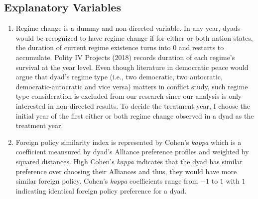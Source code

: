 \documentclass[12pt,a4paper]{article}
\begin{document}
\subsection{Explanatory Variables}
\begin{enumerate}
    \item Regime change is a dummy and non-directed variable. In any year, dyads would be recognized to have regime change if for either or both nation states, the duration of current regime existence turns into 0 and restarts to accumulate. Polity IV Projects (2018) records duration of each regime's survival at the year level. \parencite{marshall_2019_polity} Even though literature in democratic peace would argue that dyad's regime type (i.e., two democratic, two autocratic, democratic-autocratic and vice versa) matters in conflict study, such regime type consideration is excluded from our research since our analysis is only interested in non-directed results. \parencite{raknerud_1997_the} To decide the treatment year, I choose the initial year of the first either or both regime change observed in a dyad as the treatment year.
    \item Foreign policy similarity index is represented by Cohen's \textit{kappa} which is a coefficient meansured by dyad's Alliance preference profiles and weighted by squared distances. \parencite{hge_2011_choice, cohen_1960_a} High Cohen's \textit{kappa} indicates that the dyad has similar preference over choosing their Alliances and thus, they would have more similar foreign policy. Cohen's \textit{kappa} coefficients range from $-1$ to $1$ with $1$ indicating identical foreign policy preference for a dyad.
\end{enumerate}
\end{document}
